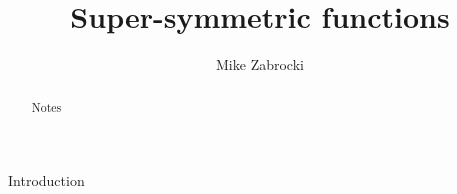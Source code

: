 \documentclass[11pt]{amsart}
\title[Super-symmetric functions]{Super-symmetric functions}
\author[Mike Zabrocki]{Mike Zabrocki}%
\date{}  %
\theoremstyle{definition}
\begin{document}
\maketitle


\begin{abstract}
Notes
\end{abstract}



\begin{section}{Introduction}

\end{section}

\begin{thebibliography}{99}
\bibitem[]{} 
\end{thebibliography}
\end{document}
